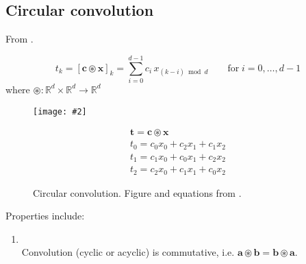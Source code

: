 \documentclass{article}
\makeatletter
\DeclareRobustCommand{\ie}{i.e.\@\xspace}
\newcommand{\gph}[2]{\texttt{[image: \#2]}}
\makeatother
\begin{document}
\subsection{Circular convolution}
\label{subsec: Circular convolution}

From \cite{plate1995holographic,nickel2016holographic,dubois2017working}.

\begin{equation}
    t_k = \left[\mathbf{c} \circledast \mathbf{x}\right]_{k} = \sum_{i=0}^{d-1} c_{i} \, x_{(k-i) \bmod d} \qquad \text{for} \; i = 0, \dotsc, d-1
\end{equation}
\noindent
where $\circledast : \mathbb{R}^{d} \times \mathbb{R}^{d} \rightarrow \mathbb{R}^{d}$


\begin{figure}[h]
\begin{minipage}{0.5\linewidth}
    \begin{center}
    \gph{0.5}{images/circular_convolution.png}
    \end{center}
\end{minipage}
\begin{minipage}{0.5\linewidth}
    \begin{equation}
        \begin{array}{c}{\mathbf{t} = \mathbf{c} \circledast \mathbf{x}} \\ {t_{0}=c_{0} x_{0}+c_{2} x_{1}+c_{1} x_{2}} \\ {t_{1}=c_{1} x_{0}+c_{0} x_{1}+c_{2} x_{2}} \\ {t_{2}=c_{2} x_{0}+c_{1} x_{1}+c_{0} x_{2}}\end{array}
    \end{equation}
\end{minipage}
\caption{Circular convolution. Figure and equations from \cite{plate1995holographic}.}
\end{figure}

Properties include:

\begin{enumerate}[label=\roman*)]
    \item { \\
                Convolution (cyclic or acyclic) is commutative, \ie{} $\mathbf{a} \circledast \mathbf{b} = \mathbf{b} \circledast \mathbf{a}$.}
\end{enumerate}





\clearpage
\singlespacing


\end{document}
